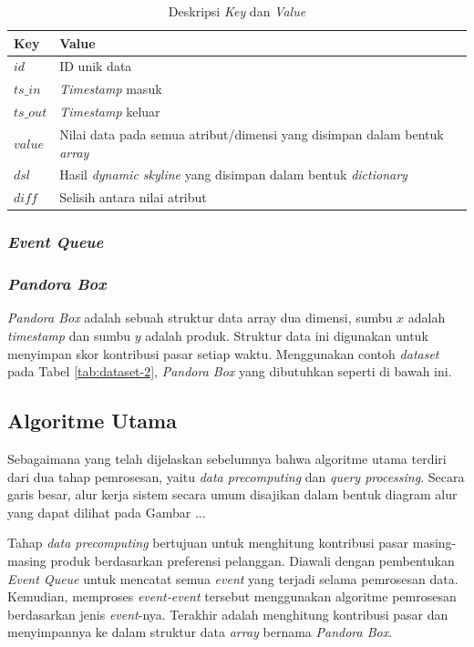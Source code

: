 \begin{table}[H]
	\centering
	\begin{tabular}{ | p{1.5cm} | p{7.5cm} | }
		\hline
		\textbf{Key} & \textbf{Value} \\ \hline \hline
		$id$ & ID unik data \\ \hline
		$ts\_in$ & \textit{Timestamp} masuk \\ \hline
		$ts\_out$ & \textit{Timestamp} keluar \\ \hline
		$value$ & Nilai data pada semua atribut/dimensi yang disimpan dalam bentuk \textit{array}\\ \hline
		$dsl$ & Hasil \textit{dynamic skyline} yang disimpan dalam bentuk \textit{dictionary} \\ \hline
		$diff$ & Selisih antara nilai atribut
	\end{tabular} 
	\caption{Deskripsi \textit{Key} dan \textit{Value}}
	\label{tab:desc-key}
\end{table}

\subsubsection{\textit{Event Queue}}

\subsubsection{\textit{Pandora Box}}
\tab \textit{Pandora Box} adalah sebuah struktur data array dua dimensi, sumbu $x$ adalah \textit{timestamp} dan sumbu $y$ adalah produk. Struktur data ini digunakan untuk menyimpan skor kontribusi pasar setiap waktu. Menggunakan contoh \textit{dataset} pada Tabel \ref{tab:dataset-2}, \textit{Pandora Box} yang dibutuhkan seperti di bawah ini.  



\subsection{Algoritme Utama}
\tab Sebagaimana yang telah dijelaskan sebelumnya bahwa algoritme utama terdiri dari dua tahap pemrosesan, yaitu \textit{data precomputing} dan \textit{query processing}. Secara garis besar, alur kerja sistem secara umum disajikan dalam bentuk diagram alur yang dapat dilihat pada Gambar ...

Tahap \textit{data precomputing} bertujuan untuk menghitung kontribusi pasar masing-masing produk berdasarkan preferensi pelanggan. Diawali dengan pembentukan \textit{Event Queue} untuk mencatat semua \textit{event} yang terjadi selama pemrosesan data. Kemudian, memproses \textit{event-event} tersebut menggunakan algoritme pemrosesan berdasarkan jenis \textit{event}-nya. Terakhir adalah menghitung kontribusi pasar dan menyimpannya ke dalam struktur data \textit{array} bernama \textit{Pandora Box}.

